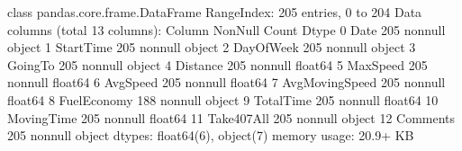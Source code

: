 \documentclass[letterpaper,10pt,english]{jupyterBook}
\begin{document}
\begin{sphinxVerbatim}[commandchars=\\\{\}]
\PYGZlt{}class \PYGZsq{}pandas.core.frame.DataFrame\PYGZsq{}\PYGZgt{}
RangeIndex: 205 entries, 0 to 204
Data columns (total 13 columns):
 \PYGZsh{}   Column          Non\PYGZhy{}Null Count  Dtype  
\PYGZhy{}\PYGZhy{}\PYGZhy{}  \PYGZhy{}\PYGZhy{}\PYGZhy{}\PYGZhy{}\PYGZhy{}\PYGZhy{}          \PYGZhy{}\PYGZhy{}\PYGZhy{}\PYGZhy{}\PYGZhy{}\PYGZhy{}\PYGZhy{}\PYGZhy{}\PYGZhy{}\PYGZhy{}\PYGZhy{}\PYGZhy{}\PYGZhy{}\PYGZhy{}  \PYGZhy{}\PYGZhy{}\PYGZhy{}\PYGZhy{}\PYGZhy{}  
 0   Date            205 non\PYGZhy{}null    object 
 1   StartTime       205 non\PYGZhy{}null    object 
 2   DayOfWeek       205 non\PYGZhy{}null    object 
 3   GoingTo         205 non\PYGZhy{}null    object 
 4   Distance        205 non\PYGZhy{}null    float64
 5   MaxSpeed        205 non\PYGZhy{}null    float64
 6   AvgSpeed        205 non\PYGZhy{}null    float64
 7   AvgMovingSpeed  205 non\PYGZhy{}null    float64
 8   FuelEconomy     188 non\PYGZhy{}null    object 
 9   TotalTime       205 non\PYGZhy{}null    float64
 10  MovingTime      205 non\PYGZhy{}null    float64
 11  Take407All      205 non\PYGZhy{}null    object 
 12  Comments        205 non\PYGZhy{}null    object 
dtypes: float64(6), object(7)
memory usage: 20.9+ KB
\end{sphinxVerbatim}

\begin{sphinxVerbatim}[commandchars=\\\{\}]
   
\end{sphinxVerbatim}

\begin{sphinxVerbatim}[commandchars=\\\{\}]
\end{sphinxVerbatim}
\end{document}
